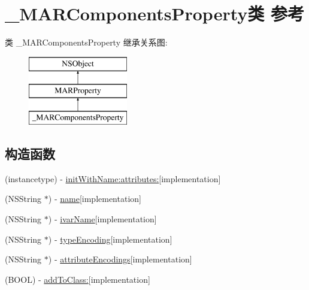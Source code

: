 \hypertarget{interface___m_a_r_components_property}{}\section{\+\_\+\+M\+A\+R\+Components\+Property类 参考}
\label{interface___m_a_r_components_property}
类 \+\_\+\+M\+A\+R\+Components\+Property 继承关系图\+:\begin{figure}[H]
\begin{center}
\leavevmode
\includegraphics[height=3.000000cm]{interface___m_a_r_components_property}
\end{center}
\end{figure}
\subsection*{构造函数}
\begin{DoxyCompactItemize}
\item 
(instancetype) -\/ \hyperlink{interface___m_a_r_components_property_a87ceb0e355d20398ec33e0cb35fc09c0}{init\+With\+Name\+:attributes\+:}{\ttfamily  \mbox{[}implementation\mbox{]}}
\item 
(N\+S\+String $\ast$) -\/ \hyperlink{interface___m_a_r_components_property_a4825e59c276f417da313ea24d4d5d312}{name}{\ttfamily  \mbox{[}implementation\mbox{]}}
\item 
(N\+S\+String $\ast$) -\/ \hyperlink{interface___m_a_r_components_property_a6c8bca188d0259d4902e7608fc08d551}{ivar\+Name}{\ttfamily  \mbox{[}implementation\mbox{]}}
\item 
(N\+S\+String $\ast$) -\/ \hyperlink{interface___m_a_r_components_property_a9ce943079d252a965552e32a44193840}{type\+Encoding}{\ttfamily  \mbox{[}implementation\mbox{]}}
\item 
(N\+S\+String $\ast$) -\/ \hyperlink{interface___m_a_r_components_property_a9bdc841854f880fa2064c69b675ed84d}{attribute\+Encodings}{\ttfamily  \mbox{[}implementation\mbox{]}}
\item 
(B\+O\+OL) -\/ \hyperlink{interface___m_a_r_components_property_a4199443a1614ab878f3a552d14ebad71}{add\+To\+Class\+:}{\ttfamily  \mbox{[}implementation\mbox{]}}
\end{DoxyCompactItemize}
